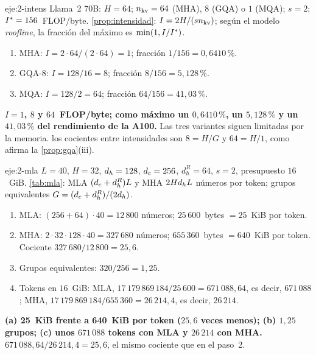 \begin{solucion}{eje:2-intens}
\datos Llama~2 70B: $H=64$; $n_{\mathrm{kv}}=64$ (MHA), $8$ (GQA) o $1$ (MQA); $s=2$; $I^{\ast}=156$~FLOP/byte.
\planteamiento \cref{prop:intensidad}: $I=2H/(sn_{\mathrm{kv}})$; según el modelo \emph{roofline}, la fracción del máximo es $\min(1,I/I^{\ast})$.
\pasos
\begin{enumerate}[label=\arabic*.]
  \item MHA: $I=2\cdot 64/(2\cdot 64)=1$; fracción $1/156=0{,}6410\,\%$.
  \item GQA-8: $I=128/16=8$; fracción $8/156=5{,}128\,\%$.
  \item MQA: $I=128/2=64$; fracción $64/156=41{,}03\,\%$.
\end{enumerate}
\resultado \textbf{$I=1$, $8$ y $64$~FLOP/byte; como máximo un $0{,}6410\,\%$, un $5{,}128\,\%$ y un $41{,}03\,\%$ del rendimiento de la A100.} Las tres variantes siguen limitadas por la memoria.
\comprobacion los cocientes entre intensidades son $8=H/G$ y $64=H/1$, como afirma la \cref{prop:gqa}(iii).
\end{solucion}

\begin{solucion}{eje:2-mla}
\datos $L=40$, $H=32$, $d_{h}=128$, $d_{c}=256$, $d_h^{R}=64$, $s=2$, presupuesto $16$~GiB.
\planteamiento \cref{tab:mla}: MLA $(d_{c}+d_h^{R})L$ y MHA $2Hd_{h} L$ números por token; grupos equivalentes $G=(d_{c}+d_h^{R})/(2d_{h})$.
\pasos
\begin{enumerate}[label=\arabic*.]
  \item MLA: $(256+64)\cdot 40=12\,800$ números; $25\,600$~bytes $=25$~KiB por token.
  \item MHA: $2\cdot 32\cdot 128\cdot 40=327\,680$ números; $655\,360$~bytes $=640$~KiB por token. Cociente $327\,680/12\,800=25{,}6$.
  \item Grupos equivalentes: $320/256=1{,}25$.
  \item Tokens en $16$~GiB: MLA, $17\,179\,869\,184/25\,600=671\,088{,}64$, es decir, $671\,088$; MHA, $17\,179\,869\,184/655\,360=26\,214{,}4$, es decir, $26\,214$.
\end{enumerate}
\resultado \textbf{(a) 25~KiB frente a 640~KiB por token ($25{,}6$ veces menos); (b) $1{,}25$ grupos; (c) unos $671\,088$ tokens con MLA y $26\,214$ con MHA.}
\comprobacion $671\,088{,}64/26\,214{,}4=25{,}6$, el mismo cociente que en el paso~2.
\end{solucion}

